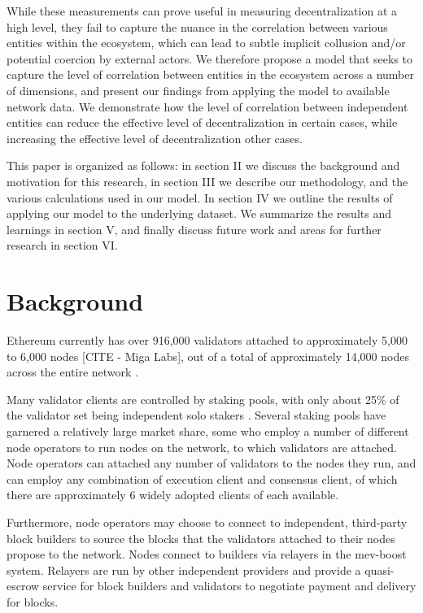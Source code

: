 \documentclass[conference]{IEEEtran}
\begin{document}
While these measurements can prove useful in measuring decentralization at a high level, they fail to capture the nuance in the correlation between various entities within the ecosystem, which can lead to subtle implicit collusion and/or potential coercion by external actors.  We therefore propose a model that seeks to capture the level of correlation between entities in the ecosystem across a number of dimensions, and present our findings from applying the model to available network data.  We demonstrate how the level of correlation between independent entities can reduce the effective level of decentralization in certain cases, while increasing the effective level of decentralization other cases.

This paper is organized as follows: in section II we discuss the background and motivation for this research, in section III we describe our methodology, and the various calculations used in our model.  In section IV we outline the results of applying our model to the underlying dataset.  We summarize the results and learnings in section V, and finally discuss future work and areas for further research in section VI.

\section{Background}

Ethereum currently has over 916,000 validators \cite{beaconchain2024} attached to approximately 5,000 to 6,000 nodes [CITE - Miga Labs], out of a total of approximately 14,000 nodes across the entire network \cite{nodewatch2024}.

Many validator clients are controlled by staking pools, with only about 25\% of the validator set being independent solo stakers \cite{dune2024}.  Several staking pools have garnered a relatively large market share, some who employ a number of different node operators to run nodes on the network, to which validators are attached.  Node operators can attached any number of validators to the nodes they run, and can employ any combination of execution client and consensus client, of which there are approximately 6 widely adopted clients of each available.

Furthermore, node operators may choose to connect to independent, third-party block builders to source the blocks that the validators attached to their nodes propose to the network. Nodes connect to builders via relayers in the mev-boost system.  Relayers are run by other independent providers and provide a quasi-escrow service for block builders and validators to negotiate payment and delivery for blocks.
\end{document}
